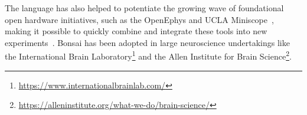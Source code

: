 The language has also helped to potentiate the growing wave of foundational
open hardware initiatives, such as the OpenEphys \citep{siegleEtAl17} and UCLA
Miniscope~\citep{caiEtAl16}, making it possible to quickly combine and
integrate these tools into new experiments~\citep{buccinoEtAl18}.
%
Bonsai has been adopted in large neuroscience undertakings like the
International Brain
Laboratory\footnote{\href{https://www.internationalbrainlab.com/}{https://www.internationalbrainlab.com/}}
and the Allen Institute for Brain
Science\footnote{\href{https://alleninstitute.org/what-we-do/brain-science/}{https://alleninstitute.org/what-we-do/brain-science/}}.
%


